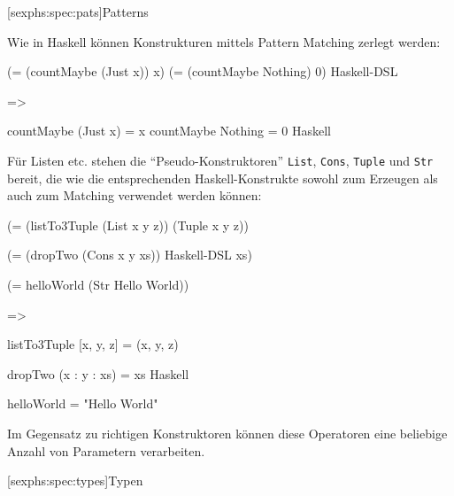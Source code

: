 \documentclass[12pt, a4paper, bibgerm]{scrbook}
\newenvironment{DIFnomarkup}{}{}
\newcommand\icode[1]{\lstinline?#1?}
\newcommand\lsubsection{}
\begin{document}
\lsubsection[sexphs:spec:pats]{Patterns}

Wie in Haskell können Konstrukturen mittels Pattern Matching zerlegt
werden:
\begin{DIFnomarkup}\begin{code}
(= (countMaybe (Just x)) x)
(= (countMaybe Nothing)  0)      Haskell-DSL

=>

countMaybe (Just x) = x
countMaybe Nothing  = 0          Haskell
\end{code}\end{DIFnomarkup}
Für Listen etc. stehen die ``Pseudo-Konstruktoren'' \icode{List},
\icode{Cons}, \icode{Tuple} und \icode{Str} bereit, die wie die
entsprechenden Haskell-Konstrukte sowohl zum Erzeugen als auch zum
Matching verwendet werden können:
\begin{DIFnomarkup}\begin{code}
(= (listTo3Tuple (List x y z)) 
   (Tuple x y z))

(= (dropTwo (Cons x y xs))             Haskell-DSL
  xs)

(= helloWorld (Str Hello World))

=>

listTo3Tuple [x, y, z] = (x, y, z)

dropTwo (x : y : xs) = xs              Haskell

helloWorld = "Hello World"
\end{code}\end{DIFnomarkup}
Im Gegensatz zu richtigen Konstruktoren können diese Operatoren eine
beliebige Anzahl von Parametern verarbeiten.

\lsubsection[sexphs:spec:types]{Typen}
\end{document}
